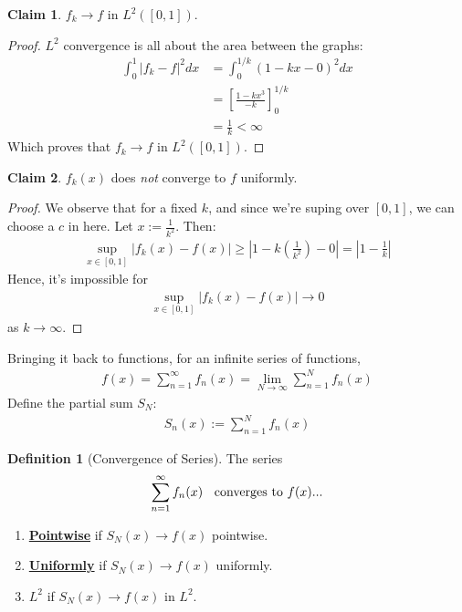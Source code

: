 \documentclass[11pt]{scrartcl}
\theoremstyle{definition}
\newtheorem{definition}{Definition}
\newtheorem{claim}{Claim}
\theoremstyle{remark}
\newcommand{\dfn}[1]{\textbf{\underline{#1}}}
\newcommand{\idx}[2]{\int_{#1}^{#2}}
\begin{document}
\begin{claim}
	$f_k \rightarrow f$ in $L^2([0,1])$.
\end{claim}
\begin{proof}
	$L^2$ convergence is all about the area between the graphs:
	\begin{align*}
		\idx{0}{1} |f_k - f|^2 dx & = \idx{0}{1/k} (1-kx-0)^2 dx \\
		& = \left[ \frac{1-kx^3}{-k} \right]_0^{1/k}  \\
		& = \frac{1}{k} < \infty 
	\end{align*}
	Which proves that $f_k \rightarrow f$ in $L^2([0,1])$.
\end{proof}

\begin{claim}
	$f_k(x)$ does \emph{not} converge to $f$ uniformly. 
\end{claim}

\begin{proof}
	We observe that for a fixed $k$, and since we're suping over $[0,1]$, we can choose a $c$ in here. Let $x := \frac{1}{k^2}$. Then: 
	\begin{align*}
		\sup_{x \in [0,1]} |f_k(x) - f(x)| \geq \left| 1 - k \left(  \frac{1}{k^2} \right) - 0  \right| = \left| 1 - \frac{1}{k} \right| 
	\end{align*}
	Hence, it's impossible for 
	\begin{align*}
		\sup_{x \in [0,1] }|f_k(x) - f(x)| \rightarrow 0
	\end{align*}
	as $k \rightarrow \infty$.
\end{proof}
Bringing it back to functions, for an infinite series of functions, 
\begin{align*}
	f(x) = \sum_{n=1}^\infty f_n(x) = \lim_{N \rightarrow \infty} \sum_{n=1}^N f_n(x) 
\end{align*}
Define the partial sum $S_N$: 
\begin{align*}
	S_n (x) := \sum_{n =1}^N f_n(x) 
\end{align*}

\begin{definition}[Convergence of Series]
	The series
	\begin{align*}
		\sum_{n=1}^\infty f_n(x) \hspace{0.2cm} \text{ converges to $f(x)$...} 
	\end{align*}
	\begin{enumerate}[noitemsep]
		\item \dfn{Pointwise} if $S_N(x) \rightarrow f(x) $ pointwise. 
		\item \dfn{Uniformly} if $S_N(x) \rightarrow f(x)$ uniformly. 
		\item \dfn{$L^2$} if $S_N(x) \rightarrow f(x)$ in $L^2$.
	\end{enumerate}
\end{definition}
\end{document}
